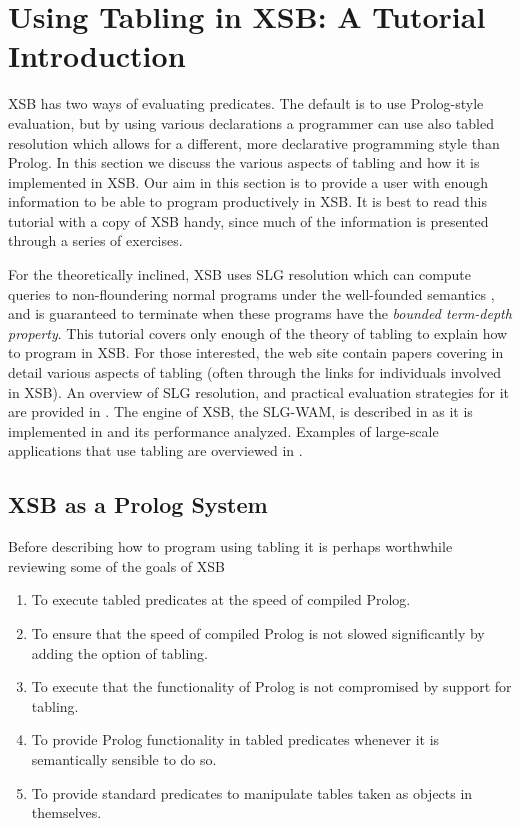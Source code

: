 \newtheorem{exercise}{Exercise}[section]

\chapter{Using Tabling in XSB: A Tutorial Introduction} 
\label{tabling_overview}

XSB has two ways of evaluating predicates.  The default is to use
Prolog-style evaluation, but by using various declarations a
programmer can use also tabled resolution which allows for a
different, more declarative programming style than Prolog.  In this
section we discuss the various aspects of tabling and how it is
implemented in XSB.  Our aim in this section is to provide a user with
enough information to be able to program productively in XSB.  It is
best to read this tutorial with a copy of XSB handy, since much of the
information is presented through a series of exercises.

For the theoretically inclined, XSB uses SLG resolution which can
compute queries to non-floundering normal programs under the
well-founded semantics \cite{VGRS91}, and is guaranteed to terminate
when these programs have the {\em bounded term-depth property}.  This
tutorial covers only enough of the theory of tabling to explain how to
program in XSB.  For those interested, the web site contain papers
covering in detail various aspects of tabling (often through the links
for individuals involved in XSB).  An overview of SLG resolution, and
practical evaluation strategies for it are provided in
\cite{ChWa96,Swif99b,SaSW99,FSW98}.  The engine of XSB, the SLG-WAM,
is described in \cite{SaSw98,RRSSW98,JFLP-Scheduling, SaSW96,
ChSW95,CAT@PLILP-98} as it is implemented in \version{} and its
performance analyzed.  Examples of large-scale applications that use
tabling are overviewed in \cite{Swif99a,CoDS96,DRW96}.

\section{XSB as a Prolog System}\label{tabling_env}

Before describing how to program using tabling it is perhaps
worthwhile reviewing some of the goals of XSB 
\begin{enumerate}
\item	To execute tabled predicates at the speed of compiled Prolog.
\item	To ensure that the speed of compiled Prolog is not slowed
	significantly by adding the option of tabling.
\item	To execute that the functionality of Prolog is not compromised
 	by support for tabling.
\item	To provide Prolog functionality in tabled predicates 
	whenever it is semantically sensible to do so.
\item	To provide standard predicates to manipulate tables
	taken as objects in themselves.
\end{enumerate}

